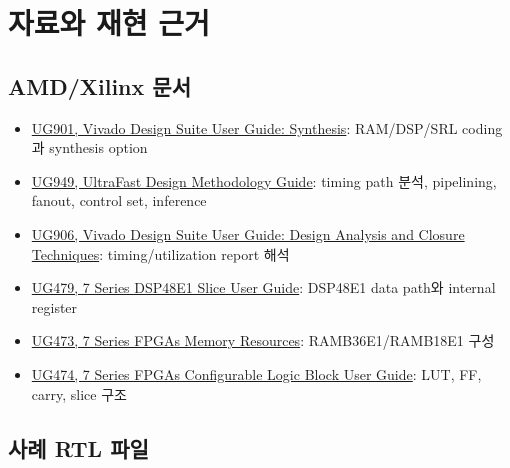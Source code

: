 \chapter{자료와 재현 근거}

\section{AMD/Xilinx 문서}

\begin{itemize}
  \item \href{https://docs.amd.com/r/en-US/ug901-vivado-synthesis}{UG901, Vivado Design Suite User Guide: Synthesis}: RAM/DSP/SRL coding과 synthesis option
  \item \href{https://docs.amd.com/r/en-US/ug949-vivado-design-methodology}{UG949, UltraFast Design Methodology Guide}: timing path 분석, pipelining, fanout, control set, inference
  \item \href{https://docs.amd.com/r/en-US/ug906-vivado-design-analysis}{UG906, Vivado Design Suite User Guide: Design Analysis and Closure Techniques}: timing/utilization report 해석
  \item \href{https://docs.amd.com/v/u/en-US/ug479_7Series_DSP48E1}{UG479, 7 Series DSP48E1 Slice User Guide}: DSP48E1 data path와 internal register
  \item \href{https://docs.amd.com/v/u/en-US/ug473_7Series_Memory_Resources}{UG473, 7 Series FPGAs Memory Resources}: RAMB36E1/RAMB18E1 구성
  \item \href{https://docs.amd.com/r/en-US/ug474_7Series_CLB}{UG474, 7 Series FPGAs Configurable Logic Block User Guide}: LUT, FF, carry, slice 구조
\end{itemize}

\section{사례 RTL 파일}

